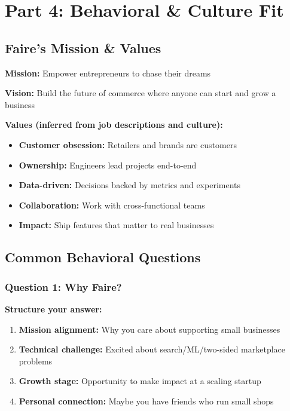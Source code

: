 \documentclass[11pt,letterpaper]{article}
\begin{document}
\section{Part 4: Behavioral \& Culture Fit}

\subsection{Faire's Mission \& Values}

\textbf{Mission:} Empower entrepreneurs to chase their dreams

\textbf{Vision:} Build the future of commerce where anyone can start and grow a business

\textbf{Values (inferred from job descriptions and culture):}
\begin{itemize}
    \item \textbf{Customer obsession:} Retailers and brands are customers
    \item \textbf{Ownership:} Engineers lead projects end-to-end
    \item \textbf{Data-driven:} Decisions backed by metrics and experiments
    \item \textbf{Collaboration:} Work with cross-functional teams
    \item \textbf{Impact:} Ship features that matter to real businesses
\end{itemize}

\subsection{Common Behavioral Questions}

\subsubsection{Question 1: Why Faire?}

\textbf{Structure your answer:}
\begin{enumerate}
    \item \textbf{Mission alignment:} Why you care about supporting small businesses
    \item \textbf{Technical challenge:} Excited about search/ML/two-sided marketplace problems
    \item \textbf{Growth stage:} Opportunity to make impact at a scaling startup
    \item \textbf{Personal connection:} Maybe you have friends who run small shops
\end{enumerate}
\end{document}
